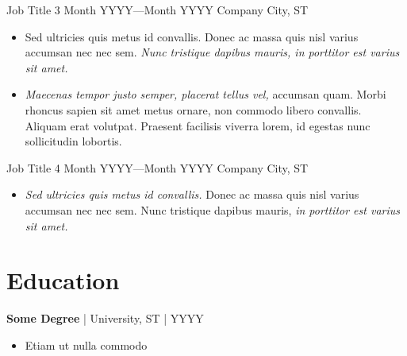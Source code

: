 \documentclass{james-cv}
\begin{document}
\employment
  {Job Title 3}
  {Month YYYY---Month YYYY}
  {Company}
  {City, ST}

\lipsum[3]

\begin{itemize}
\item{
  Sed ultricies quis metus id convallis. Donec ac massa quis nisl varius accumsan
  nec nec sem. \emph{Nunc tristique dapibus mauris, in porttitor est varius sit
  amet.}
}
\item{
  \emph{Maecenas tempor justo semper, placerat tellus vel,} accumsan quam. Morbi
  rhoncus sapien sit amet metus ornare, non commodo libero convallis. Aliquam
  erat volutpat. Praesent facilisis viverra lorem, id egestas nunc sollicitudin
  lobortis. 
}
\end{itemize}


\employment
  {Job Title 4}
  {Month YYYY---Month YYYY}
  {Company}
  {City, ST}

\lipsum[4]

\begin{itemize}
\item{
  \emph{Sed ultricies quis metus id convallis.} Donec ac massa quis nisl varius
  accumsan nec nec sem. Nunc tristique dapibus mauris, \emph{in porttitor est 
  varius sit amet.}
}
\end{itemize}


\vspace{-1em}
\section{Education}

\textbf{Some Degree} | 
University, ST | YYYY
\begin{itemize}[noitemsep,topsep=0em]
\item{Etiam ut nulla commodo}
\end{itemize}
\end{document}
